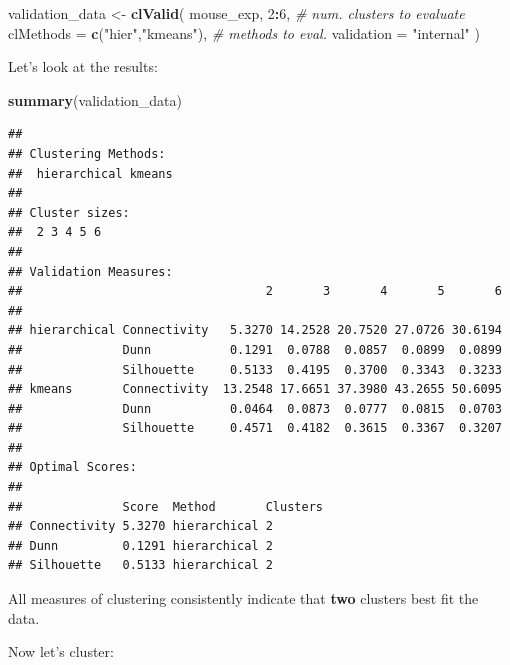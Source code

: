 \documentclass[
]{book}
\newenvironment{Shaded}{\begin{snugshade}}{\end{snugshade}}
\newcommand{\AttributeTok}[1]{\textcolor[rgb]{0.13,0.29,0.53}{#1}}
\newcommand{\CommentTok}[1]{\textcolor[rgb]{0.56,0.35,0.01}{\textit{#1}}}
\newcommand{\DecValTok}[1]{\textcolor[rgb]{0.00,0.00,0.81}{#1}}
\newcommand{\FunctionTok}[1]{\textcolor[rgb]{0.13,0.29,0.53}{\textbf{#1}}}
\newcommand{\NormalTok}[1]{#1}
\newcommand{\OtherTok}[1]{\textcolor[rgb]{0.56,0.35,0.01}{#1}}
\newcommand{\SpecialCharTok}[1]{\textcolor[rgb]{0.81,0.36,0.00}{\textbf{#1}}}
\newcommand{\StringTok}[1]{\textcolor[rgb]{0.31,0.60,0.02}{#1}}
\begin{document}
\begin{Shaded}
\begin{Highlighting}[]
\NormalTok{validation\_data }\OtherTok{\textless{}{-}} \FunctionTok{clValid}\NormalTok{(}
\NormalTok{    mouse\_exp,}
    \DecValTok{2}\SpecialCharTok{:}\DecValTok{6}\NormalTok{, }\CommentTok{\# num. clusters to evaluate}
    \AttributeTok{clMethods =} \FunctionTok{c}\NormalTok{(}\StringTok{"hier"}\NormalTok{,}\StringTok{"kmeans"}\NormalTok{), }\CommentTok{\# methods to eval.}
    \AttributeTok{validation =} \StringTok{"internal"}
\NormalTok{)}
\end{Highlighting}
\end{Shaded}

Let's look at the results:

\begin{Shaded}
\begin{Highlighting}[]
\FunctionTok{summary}\NormalTok{(validation\_data)}
\end{Highlighting}
\end{Shaded}

\begin{verbatim}
## 
## Clustering Methods:
##  hierarchical kmeans 
## 
## Cluster sizes:
##  2 3 4 5 6 
## 
## Validation Measures:
##                                  2       3       4       5       6
##                                                                   
## hierarchical Connectivity   5.3270 14.2528 20.7520 27.0726 30.6194
##              Dunn           0.1291  0.0788  0.0857  0.0899  0.0899
##              Silhouette     0.5133  0.4195  0.3700  0.3343  0.3233
## kmeans       Connectivity  13.2548 17.6651 37.3980 43.2655 50.6095
##              Dunn           0.0464  0.0873  0.0777  0.0815  0.0703
##              Silhouette     0.4571  0.4182  0.3615  0.3367  0.3207
## 
## Optimal Scores:
## 
##              Score  Method       Clusters
## Connectivity 5.3270 hierarchical 2       
## Dunn         0.1291 hierarchical 2       
## Silhouette   0.5133 hierarchical 2
\end{verbatim}

All measures of clustering consistently indicate that \textbf{two} clusters best fit the data.

Now let's cluster:
\end{document}

